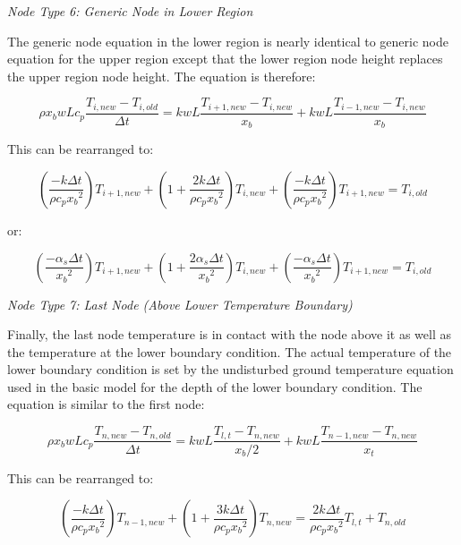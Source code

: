 \emph{\textit{Node Type 6: Generic Node in Lower Region}}

The generic node equation in the lower region is nearly identical to generic node equation for the upper region except that the lower region node height replaces the upper region node height.  The equation is therefore:

\begin{equation}
\rho x_b w L c_p \frac{T_{i,new} - T_{i,old}}{\Delta t} = k w L \frac{T_{i+1,new}-T_{i,new}}{x_b} + k w L \frac{T_{i-1,new}-T_{i,new}}{x_b}
\end{equation}

This can be rearranged to:

\begin{equation}
(\frac{-k \Delta t}{\rho c_p {x_b}^2}) T_{i+1,new} + (1 + \frac{2 k \Delta t}{\rho c_p {x_b}^2}) T_{i,new} + (\frac{-k \Delta t}{\rho c_p {x_b}^2}) T_{i+1,new} = T_{i,old}
\end{equation}

or:

\begin{equation}
(\frac{-\alpha_s \Delta t}{{x_b}^2}) T_{i+1,new} + (1 + \frac{2 \alpha_s \Delta t}{{x_b}^2}) T_{i,new} + (\frac{-\alpha_s \Delta t}{{x_b}^2}) T_{i+1,new} = T_{i,old}
\end{equation}

\emph{\textit{Node Type 7: Last Node (Above Lower Temperature Boundary)}}

Finally, the last node temperature is in contact with the node above it as well as the temperature at the lower boundary condition.  The actual temperature of the lower boundary condition is set by the undisturbed ground temperature equation used in the basic model for the depth of the lower boundary condition.  The equation is similar to the first node:

\begin{equation}
\rho x_b w L c_p \frac{T_{n,new} - T_{n,old}}{\Delta t} = k w L \frac{T_{l,t} - T_{n,new}}{x_b / 2} + k w L \frac{T_{n-1,new} - T_{n,new}}{x_t}
\end{equation}

This can be rearranged to:

\begin{equation}
(\frac{-k \Delta t}{\rho c_p {x_b}^2}) T_{n-1,new} + (1 + \frac{3 k \Delta t}{\rho c_p {x_b}^2}) T_{n,new} = \frac{2 k \Delta t}{\rho c_p {x_b}^2} T_{l,t} + T_{n,old}
\end{equation}

